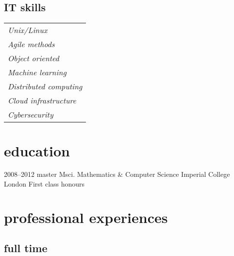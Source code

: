 \documentclass[]{friggeri-cv} %
\begin{document}
\begin{aside}
\section{IT skills}
    {\def\arraystretch{0.3}%
    \begin{tabular}{l}
        \emph{Unix/Linux} \\
        \emph{Agile methods} \\
        \emph{Object oriented} \\
        \emph{Machine learning} \\
        \emph{Distributed computing} \\
        \emph{Cloud infrastructure} \\
        \emph{Cybersecurity} \\
    \end{tabular}%
    }
\end{aside}


\section{education}

\begin{entrylist}

\entry
{2008--2012}
{master {\normalfont Msci. Mathematics \& Computer Science}}
{Imperial College London}
{First class honours}


\end{entrylist}


\section{professional experiences}

\subsection{full time}
\end{document}
